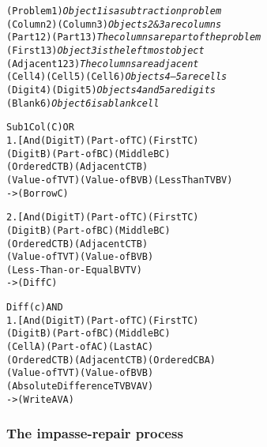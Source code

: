 \begin{fancytable}
\small
\begin{alltt}
        (Problem 1)                 {\em Object 1 is a subtraction problem}
        (Column 2) (Column 3)       {\em Objects 2 \& 3 are columns}
        (Part 1 2) (Part 1 3)       {\em The columns are part of the problem}
        (First 1 3)                 {\em Object 3 is the leftmost object}
        (Adjacent 1 2 3)            {\em The columns are adjacent}
        (Cell 4) (Cell 5) (Cell 6)  {\em Objects 4--5 are cells}
        (Digit 4) (Digit 5)         {\em Objects 4 and 5 are digits}
        (Blank 6)                   {\em Object 6 is a blank cell}

        Sub1Col(C) OR
        1. [And (Digit T) (Part-of T C) (First T C)
                (Digit B) (Part-of B C) (Middle B C)
                (Ordered C T B) (Adjacent C T B)
                (Value-of TV T) (Value-of BV B) (LessThan TV BV)
           ->   (Borrow C)

        2. [And (Digit T) (Part-of T C) (First T C)
                (Digit B) (Part-of B C) (Middle B C)
                (Ordered C T B) (Adjacent C TB)
                (Value-of TV T) (Value-of BV B)
                (Less-Than-or-Equal BV TV)
           ->   (Diff C)

        Diff(c) AND
        1. [And (Digit T) (Part-of T C) (First T C)
                (Digit B) (Part-of B C) (Middle B C)
                (Cell A) (Part-of A C) (Last A C)
                (Ordered C T B) (Adjacent C T B) (Ordered C BA)
                (Value-of TV T) (Value-of BV B)
                (AbsoluteDifference TV BV AV)
           ->   (Write AV A)
\end{alltt}
\caption{Part of the problem representation for 57$-$9, and part
of a subtraction procedure, both using Sierra's representation from
\protect\cite[table~3.8 and 3.10]{mindbugs}.}\label{f:procrep}
\end{fancytable}


\subsubsection{The impasse-repair process}

